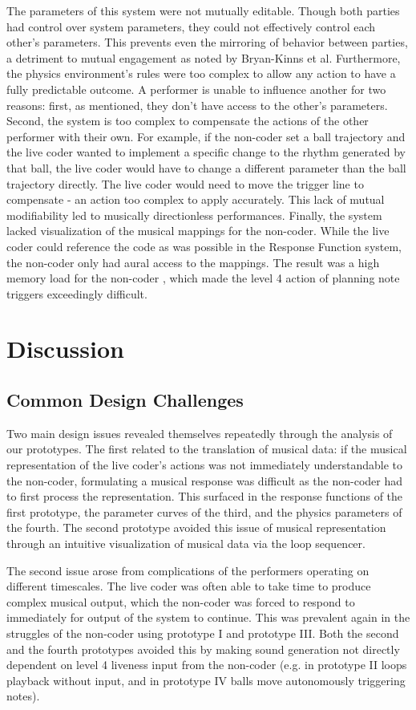 \documentclass{nime-alternate}
\begin{document}
The parameters of this system were not mutually editable. Though both parties had control over system parameters, they could not effectively control each other's parameters. This prevents even the mirroring of behavior between parties, a detriment to mutual engagement as noted by Bryan-Kinns et al. Furthermore, the physics environment's rules were too complex to allow any action to have a fully predictable outcome. A performer is unable to influence another for two reasons: first, as mentioned, they don't have access to the other's parameters. Second, the system is too complex to compensate the actions of the other performer with their own. For example, if the non-coder set a ball trajectory and the live coder wanted to implement a specific change to the rhythm generated by that ball, the live coder would have to change a different parameter than the ball trajectory directly. The live coder would need to move the trigger line to compensate - an action too complex to apply accurately. This lack of mutual modifiability led to musically directionless performances.
Finally, the system lacked visualization of the musical mappings for the non-coder. While the live coder could reference the code as was possible in the Response Function system, the non-coder only had aural access to the mappings. The result was a high memory load for the non-coder \cite{nielsen_heuristic_1994}, which made the level 4 action of planning note triggers exceedingly difficult.

\section{Discussion}
\subsection{Common Design Challenges}
Two main design issues revealed themselves repeatedly through the analysis of our prototypes. The first related to the translation of musical data: if the musical representation of the live coder's actions was not immediately understandable to the non-coder, formulating a musical response was difficult as the non-coder had to first process the representation. This surfaced in the response functions of the first prototype, the parameter curves of the third, and the physics parameters of the fourth. The second prototype avoided this issue of musical representation through an intuitive visualization of musical data via the loop sequencer.

The second issue arose from complications of the performers operating on different timescales. The live coder was often able to take time to produce complex musical output, which the non-coder was forced to respond to immediately for output of the system to continue. This was prevalent again in the struggles of the non-coder using prototype I and prototype III. Both the second and the fourth prototypes avoided this by making sound generation not directly dependent on level 4 liveness input from the non-coder (e.g. in prototype II loops playback without input, and in prototype IV balls move autonomously triggering notes).
\end{document}
